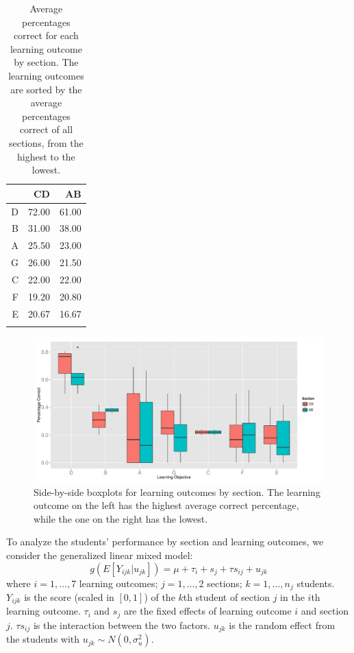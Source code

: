 \documentclass[12pt,nohyper]{tufte-handout}\usepackage[]{graphicx}\usepackage[]{color}
\begin{document}
\begin{longtable}{rrr}
  \hline
 & CD & AB \\ 
  \hline
D & 72.00 & 61.00 \\ 
  B & 31.00 & 38.00 \\ 
  A & 25.50 & 23.00 \\ 
  G & 26.00 & 21.50 \\ 
  C & 22.00 & 22.00 \\ 
  F & 19.20 & 20.80 \\ 
  E & 20.67 & 16.67 \\ 
   \hline
\hline
\caption{Average percentages correct for each learning outcome by section. The learning outcomes are sorted by the average percentages correct of all sections, from the highest to the lowest.} 
\label{tab:Oset}
\end{longtable}
\begin{center}
\begin{figure}
\begin{centering}
\includegraphics[width=0.98\linewidth]{Topic06_Sidebyside_Boxplots_LearningObj}
\par\end{centering}
\caption{\label{sbsb-os}Side-by-side boxplots for learning outcomes by section. The learning outcome on the left has the highest average correct percentage, while the one on the right has the lowest.}
\end{figure}
\par\end{center}

\clearpage
\newpage{}

To analyze the students' performance by section and learning outcomes, 
we consider the generalized linear mixed model:
\[
g(E[Y_{ijk}|u_{jk}])= \mu+\tau_{i}+s_{j}+\tau s_{ij}+u_{jk}
\]
where $i=1,...,$7 learning outcomes; 
$j=1,...,$2 sections; $k=1,...,n_j$ students.
$Y_{ijk}$ is the score (scaled in $[0,1]$) of the $k$th student of 
section $j$ in the $i$th learning outcome. $\tau_i$ and $s_{j}$ are the 
fixed effects of learning outcome $i$ and section $j$. 
$\tau s_{ij}$ is the interaction between the two factors.
$u_{jk}$ is the random effect from the students with 
$u_{jk} \sim N(0,\sigma_{u}^{2})$.
\end{document}
